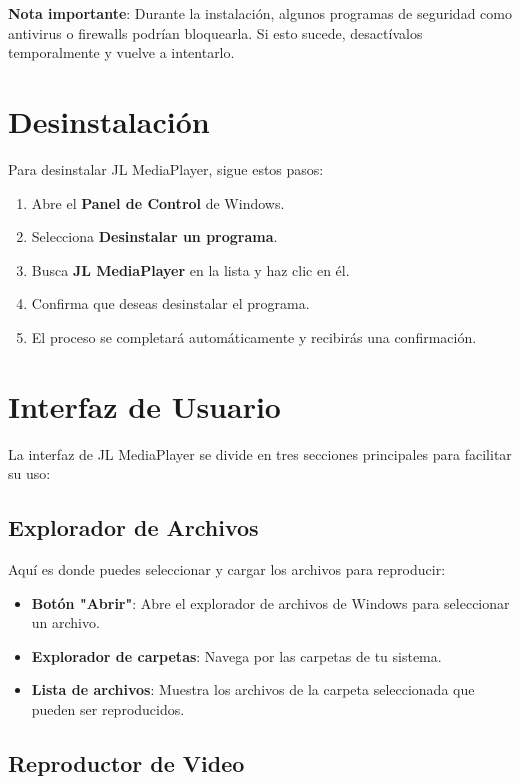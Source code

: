 \documentclass[a4paper,12pt]{article}
\begin{document}
\textbf{Nota importante}: Durante la instalación, algunos programas de seguridad como antivirus o firewalls podrían bloquearla. Si esto sucede, desactívalos temporalmente y vuelve a intentarlo.

\section*{Desinstalación}

Para desinstalar JL MediaPlayer, sigue estos pasos:

\begin{enumerate}
    \item Abre el \textbf{Panel de Control} de Windows.
    \item Selecciona \textbf{Desinstalar un programa}.
    \item Busca \textbf{JL MediaPlayer} en la lista y haz clic en él.
    \item Confirma que deseas desinstalar el programa.
    \item El proceso se completará automáticamente y recibirás una confirmación.
\end{enumerate}

\section*{Interfaz de Usuario}

La interfaz de JL MediaPlayer se divide en tres secciones principales para facilitar su uso:

\subsection*{Explorador de Archivos}

Aquí es donde puedes seleccionar y cargar los archivos para reproducir:

\begin{itemize}
    \item \textbf{Botón "Abrir"}: Abre el explorador de archivos de Windows para seleccionar un archivo.
    \item \textbf{Explorador de carpetas}: Navega por las carpetas de tu sistema.
    \item \textbf{Lista de archivos}: Muestra los archivos de la carpeta seleccionada que pueden ser reproducidos.
\end{itemize}

\subsection*{Reproductor de Video}
\end{document}
